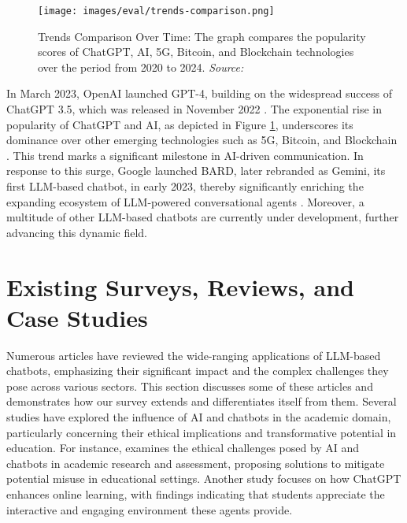
\begin{figure}[h!]
    \centering
    \texttt{[image: images/eval/trends-comparison.png]}
    \caption{Trends Comparison Over Time: The graph compares the popularity scores of ChatGPT, AI, 5G, Bitcoin, and Blockchain technologies over the period from 2020 to 2024. \textit{Source:} \cite{googletrends2023}}
    \label{fig:chatgpt_popularity}
\end{figure}


In March 2023, OpenAI launched GPT-4, building on the widespread success of ChatGPT 3.5, which was released in November 2022 \cite{bahrini2023chatgpt, zhang2023one}. The exponential rise in popularity of ChatGPT and AI, as depicted in Figure \ref{fig:chatgpt_popularity}, underscores its dominance over other emerging technologies such as 5G, Bitcoin, and Blockchain \cite{googletrends2023}. This trend marks a significant milestone in AI-driven communication. In response to this surge, Google launched BARD, later rebranded as Gemini, its first LLM-based chatbot, in early 2023, thereby significantly enriching the expanding ecosystem of LLM-powered conversational agents \cite{wikipedia2024gemini}. Moreover, a multitude of other LLM-based chatbots are currently under development, further advancing this dynamic field.

\section{Existing Surveys, Reviews, and Case Studies}

Numerous articles have reviewed the wide-ranging applications of LLM-based chatbots, emphasizing their significant impact and the complex challenges they pose across various sectors. This section discusses some of these articles and demonstrates how our survey extends and differentiates itself from them.
Several studies have explored the influence of AI and chatbots in the academic domain, particularly concerning their ethical implications and transformative potential in education. For instance, \cite{kooli2023chatbots} examines the ethical challenges posed by AI and chatbots in academic research and assessment, proposing solutions to mitigate potential misuse in educational settings. Another study \cite{tlili2023if} focuses on how ChatGPT enhances online learning, with findings indicating that students appreciate the interactive and engaging environment these agents provide.


